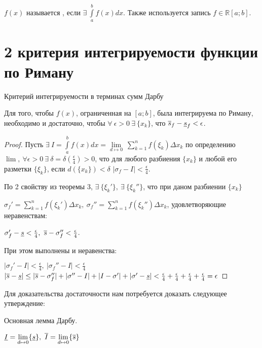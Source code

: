 \begin{opred}
$f(x)$ называется , если $\exists\ \int\limits^b_af(x)dx$. Также используется запись $f\in \mathbb{R}[a;b]$.
\end{opred}
\section{2 критерия интегрируемости функции по Риману}
\begin{theor}Критерий интегрируемости в терминах сумм Дарбу

Для того, чтобы $f(x)$, ограниченная на $[a;b]$, была интегрируема по Риману, необходимо и достаточно, чтобы $\forall\ \epsilon>0\ \exists\ \{x_k\}$, что $\overline{s}_f-\underline{s}_f<\epsilon$.
\end{theor}
\begin{proof}

Пусть $\exists\ I=\int\limits^b_af(x)dx=\underset{d\mapsto0}{\lim}\ \sum\limits^n_{k=1}f(\xi_k)\Delta x_k$ \then по определению $\lim,\ \forall \epsilon>0\ \exists\ \delta=\delta(\frac\epsilon4)>0$, что для любого разбиения $\{x_k\}$ и любой его разметки $\{\xi_k\}$, если $d(\{x_k\})<\delta$ \then $|\sigma_f-I|<\frac\epsilon4$.

По 2 свойству из теоремы 3, $\exists\ \{\xi_k'\},\ \exists\ \{\xi_k''\}$, что при даном разбиении $\{x_k\}$

$\sigma_f'=\sum\limits^n_{k=1}f(\xi_k')\Delta x_k,\ \sigma_f''=\sum\limits^n_{k=1}f(\xi_k'')\Delta x_k$, удовлетворяющие неравенствам:

$\sigma_f'-\ns<\frac\epsilon4,\ \vs-\sigma_f''<\frac\epsilon4$.

При этом выполнены и неравенства:

$|\sigma_f'-I|<\frac\epsilon4,\ |\sigma_f''-I|<\frac\epsilon4$ \then $|\overline{s}-\underline{s}|\leq|\overline{s}-\sigma_f''|+|\sigma''-I|+|I-\sigma'|+|\sigma'-\underline{s}|<\frac\epsilon4+\frac\epsilon4+\frac\epsilon4+\frac\epsilon4=\epsilon$
\end{proof}
Для доказательства достаточности нам потребуется доказать следующее утверждение:
\begin{lemma}Основная лемма Дарбу.

$\nis=\underset{d\mapsto0}{\lim}\{\ns\},\ \vis=\underset{d\mapsto0}{\lim}\{\vs\}$
\end{lemma}
